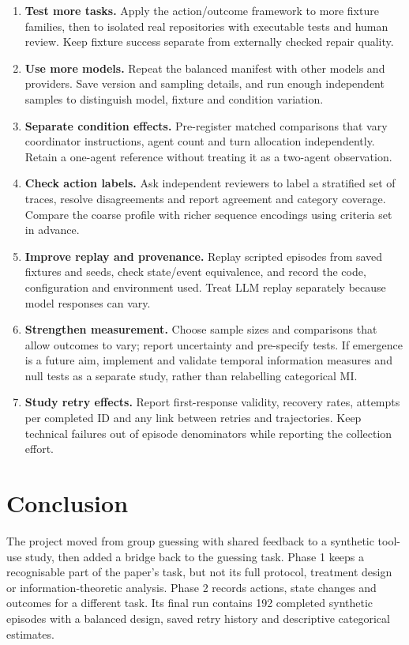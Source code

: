 \documentclass[12pt,a4paper,oneside]{report}
\begin{document}
\begin{enumerate}
\item \textbf{Test more tasks.} Apply the action/outcome framework to more fixture families, then to isolated real repositories with executable tests and human review. Keep fixture success separate from externally checked repair quality.
\item \textbf{Use more models.} Repeat the balanced manifest with other models and providers. Save version and sampling details, and run enough independent samples to distinguish model, fixture and condition variation.
\item \textbf{Separate condition effects.} Pre-register matched comparisons that vary coordinator instructions, agent count and turn allocation independently. Retain a one-agent reference without treating it as a two-agent observation.
\item \textbf{Check action labels.} Ask independent reviewers to label a stratified set of traces, resolve disagreements and report agreement and category coverage. Compare the coarse profile with richer sequence encodings using criteria set in advance.
\item \textbf{Improve replay and provenance.} Replay scripted episodes from saved fixtures and seeds, check state/event equivalence, and record the code, configuration and environment used. Treat LLM replay separately because model responses can vary.
\item \textbf{Strengthen measurement.} Choose sample sizes and comparisons that allow outcomes to vary; report uncertainty and pre-specify tests. If emergence is a future aim, implement and validate temporal information measures and null tests as a separate study, rather than relabelling categorical MI.
\item \textbf{Study retry effects.} Report first-response validity, recovery rates, attempts per completed ID and any link between retries and trajectories. Keep technical failures out of episode denominators while reporting the collection effort.
\end{enumerate}
\section{Conclusion}
The project moved from group guessing with shared feedback to a synthetic tool-use study, then added a bridge back to the guessing task. Phase 1 keeps a recognisable part of the paper’s task, but not its full protocol, treatment design or information-theoretic analysis. Phase 2 records actions, state changes and outcomes for a different task. Its final run contains 192 completed synthetic episodes with a balanced design, saved retry history and descriptive categorical estimates.
\end{document}

